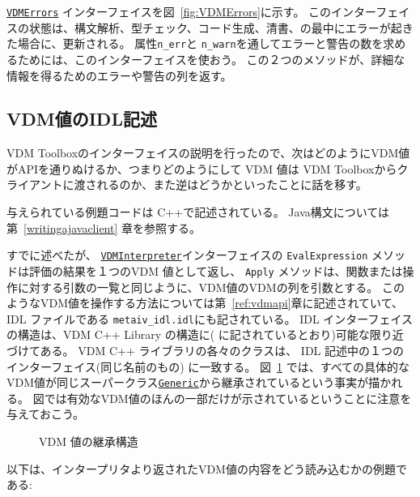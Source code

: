 \documentclass[\pformat,12pt]{jarticle}
\newcommand{\Generic}{\hyperlink{interface.Generic}{Generic}}
\newcommand{\VDMErrors}{\hyperlink{interface.VDMErrors}{VDMErrors}}
\newcommand{\VDMInterpreter}{\hyperlink{interface.VDMInterpreter}{VDMInterpreter}}
\begin{document}
 {\tt \VDMErrors} インターフェイスを図~\ref{fig:VDMErrors}に示す。
このインターフェイスの状態は、構文解析、型チェック、コード生成、清書、の最中にエラーが起きた場合に、更新される。
属性{\tt n\_err}と {\tt n\_warn}を通してエラーと警告の数を求めるためには、このインターフェイスを使おう。
この２つのメソッドが、詳細な情報を得るためのエラーや警告の列を返す。

\subsection{VDM値のIDL記述}
\label{idldescriptionvalues}

 VDM Toolboxのインターフェイスの説明を行ったので、次はどのようにVDM値がAPIを通りぬけるか、つまりどのようにして VDM 値は VDM Toolboxからクライアントに渡されるのか、また逆はどうかといったことに話を移す。

与えられている例題コードは C++で記述されている。
Java構文については第~\ref{writingajavaclient} 章を参照する。

すでに述べたが、 {\tt  \VDMInterpreter}インターフェイスの {\tt EvalExpression} メソッドは評価の結果を１つのVDM 値として返し、 {\tt Apply} メソッドは、関数または操作に対する引数の一覧と同じように、VDM値のVDMの列を引数とする。
このようなVDM値を操作する方法については第~\ref{ref:vdmapi}章に記述されていて、IDL ファイルである {\tt metaiv\_idl.idl}にも記されている。
 IDL インターフェイスの構造は、VDM C++ Library の構造に( \cite{LibMan-SCSK}に記されているとおり)可能な限り近づけてある。
VDM C++ ライブラリの各々のクラスは、 IDL 記述中の１つのインターフェイス(同じ名前のもの) に一致する。 
図~\ref{fig:VDMvalues} では、すべての具体的なVDM値が同じスーパークラス{\tt  \Generic}から継承されているという事実が描かれる。
図では有効なVDM値のほんの一部だけが示されているということに注意を与えておこう。

\begin{figure}[tbh]
\begin{center}
\mbox{}
\caption{VDM 値の継承構造}\label{fig:VDMvalues}
\end{center}
\end{figure}

以下は、インタープリタより返されたVDM値の内容をどう読み込むかの例題である:
\end{document}
